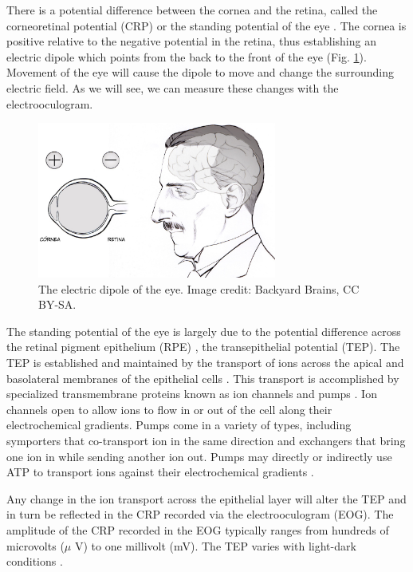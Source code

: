 \documentclass[12pt]{article}
\begin{document}
There is a potential difference between the cornea and the retina, called the corneoretinal potential (CRP) or the standing potential of the eye \cite{heide1999electrooculography,marg1951development,malmivuo1995bioelectromagnetism}. The cornea is positive relative to the negative potential in the retina, thus establishing an electric dipole which points from the back to the front of the eye (Fig. \ref{fig:crp}). Movement of the eye will cause the dipole to move and change the surrounding electric field. As we will see, we can measure these changes with the electrooculogram.

\begin{figure}[h!]
\centering
\includegraphics[width=0.7\textwidth]{images/eyePolarity.jpg}
\caption{The electric dipole of the eye. Image credit: Backyard Brains, CC BY-SA.}
\label{fig:crp}
\end{figure}

The standing potential of the eye is largely due to the potential difference across the retinal pigment epithelium (RPE) \cite{heide1999electrooculography,berg1991dipole}, the transepithelial potential (TEP). The TEP is established and maintained by the transport of ions across the apical and basolateral membranes of the epithelial cells \cite{joseph1991apical,quinn1992ion}. This transport is accomplished by specialized transmembrane proteins known as ion channels and pumps \cite{khanTransport}. Ion channels open to allow ions to flow in or out of the cell along their electrochemical gradients. Pumps come in a variety of types, including symporters that co-transport ion in the same direction and exchangers that bring one ion in while sending another ion out. Pumps may directly or indirectly use ATP to transport ions against their electrochemical gradients \cite{khanTransport}. 

Any change in the ion transport across the epithelial layer will alter the TEP and in turn be reflected in the CRP recorded via the electrooculogram (EOG). The amplitude of the CRP recorded in the EOG typically ranges from hundreds of microvolts ($\mu$ V) to one millivolt (mV). The TEP varies with light-dark conditions \cite{heide1999electrooculography}.
\end{document}
